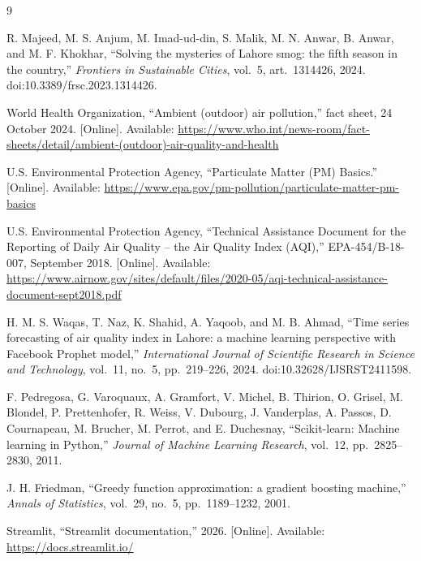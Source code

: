 \documentclass[11pt]{article}
\begin{document}
\newpage
\tableofcontents
\newpage






\appendix


\begin{thebibliography}{9}

R. Majeed, M. S. Anjum, M. Imad-ud-din, S. Malik, M. N. Anwar, B. Anwar, and M. F. Khokhar,
``Solving the mysteries of Lahore smog: the fifth season in the country,''
\emph{Frontiers in Sustainable Cities}, vol.~5, art.~1314426, 2024.
doi:10.3389/frsc.2023.1314426.

World Health Organization,
``Ambient (outdoor) air pollution,'' fact sheet, 24 October 2024.
[Online]. Available: \url{https://www.who.int/news-room/fact-sheets/detail/ambient-(outdoor)-air-quality-and-health}

U.S. Environmental Protection Agency,
``Particulate Matter (PM) Basics.''
[Online]. Available: \url{https://www.epa.gov/pm-pollution/particulate-matter-pm-basics}

U.S. Environmental Protection Agency,
``Technical Assistance Document for the Reporting of Daily Air Quality -- the Air Quality Index (AQI),'' EPA-454/B-18-007, September 2018.
[Online]. Available: \url{https://www.airnow.gov/sites/default/files/2020-05/aqi-technical-assistance-document-sept2018.pdf}

H. M. S. Waqas, T. Naz, K. Shahid, A. Yaqoob, and M. B. Ahmad,
``Time series forecasting of air quality index in Lahore: a machine learning perspective with Facebook Prophet model,''
\emph{International Journal of Scientific Research in Science and Technology}, vol.~11, no.~5, pp.~219--226, 2024.
doi:10.32628/IJSRST2411598.

F. Pedregosa, G. Varoquaux, A. Gramfort, V. Michel, B. Thirion, O. Grisel, M. Blondel, P. Prettenhofer, R. Weiss, V. Dubourg, J. Vanderplas, A. Passos, D. Cournapeau, M. Brucher, M. Perrot, and E. Duchesnay,
``Scikit-learn: Machine learning in Python,''
\emph{Journal of Machine Learning Research}, vol.~12, pp.~2825--2830, 2011.

J. H. Friedman,
``Greedy function approximation: a gradient boosting machine,''
\emph{Annals of Statistics}, vol.~29, no.~5, pp.~1189--1232, 2001.

Streamlit,
``Streamlit documentation,'' 2026.
[Online]. Available: \url{https://docs.streamlit.io/}

\end{thebibliography}
\end{document}
